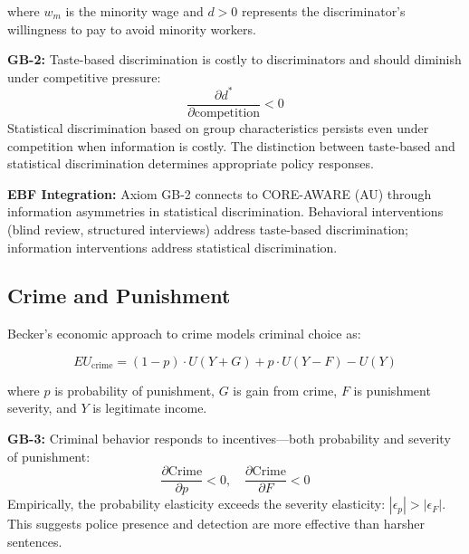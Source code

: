 where $w_m$ is the minority wage and $d > 0$ represents the discriminator's willingness to pay to avoid minority workers.

\begin{axiom}
\label{ax:gb-2}
\textbf{GB-2:} Taste-based discrimination is costly to discriminators and should diminish under competitive pressure:
\begin{equation}
\frac{\partial d^*}{\partial \text{competition}} < 0
\end{equation}
Statistical discrimination based on group characteristics persists even under competition when information is costly. The distinction between taste-based and statistical discrimination determines appropriate policy responses.
\end{axiom}

\textbf{EBF Integration:} Axiom GB-2 connects to CORE-AWARE (AU) through information asymmetries in statistical discrimination. Behavioral interventions (blind review, structured interviews) address taste-based discrimination; information interventions address statistical discrimination.

\subsection{Crime and Punishment}
\label{subsec:gb-crime}

Becker's economic approach to crime \citep{PAP-becker1968crime} models criminal choice as:

\begin{equation}
EU_{\text{crime}} = (1-p) \cdot U(Y + G) + p \cdot U(Y - F) - U(Y)
\label{eq:gb-crime}
\end{equation}

where $p$ is probability of punishment, $G$ is gain from crime, $F$ is punishment severity, and $Y$ is legitimate income.

\begin{axiom}
\label{ax:gb-3}
\textbf{GB-3:} Criminal behavior responds to incentives---both probability and severity of punishment:
\begin{equation}
\frac{\partial \text{Crime}}{\partial p} < 0, \quad \frac{\partial \text{Crime}}{\partial F} < 0
\end{equation}
Empirically, the probability elasticity exceeds the severity elasticity: $|\epsilon_p| > |\epsilon_F|$. This suggests police presence and detection are more effective than harsher sentences.
\end{axiom}

